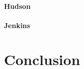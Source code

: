 \documentclass[runningheads]{llncs}
\newcommand{\seclabel}[1]{\label{sec:#1}}
\begin{document}
\paragraph{Hudson}

\paragraph{Jenkins}

\section{Conclusion} \seclabel{conclusion}



%



\end{document}
